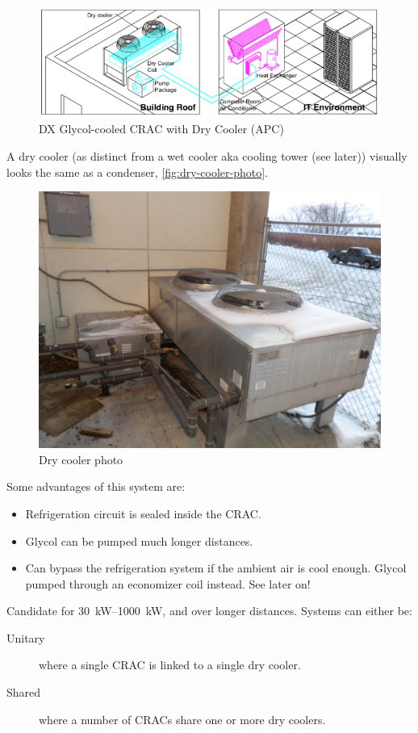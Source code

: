 \documentclass{pgnotes}
\begin{document}
\begin{figure}[hptb]
  \centering
  \includegraphics[width=1.0\linewidth]{crac_dx_glycol_schematic}
  \caption{DX Glycol-cooled CRAC with Dry Cooler (APC)}
  \label{fig:crac-dx-glycol-dry-cooler}
\end{figure}

A dry cooler (as distinct from a wet cooler aka cooling tower (see later)) visually looks the same as a condenser, \autoref{fig:dry-cooler-photo}.

\begin{figure}[htbp]
    \centering
    \includegraphics[width=0.4\linewidth]{dry_cooler_photo}
    \caption{Dry cooler photo}
    \label{fig:dry-cooler-photo}
\end{figure}

Some advantages of this system are:
\begin{itemize}
\item Refrigeration circuit is sealed inside the CRAC.
\item Glycol can be pumped much longer distances.
\item Can bypass the refrigeration system if the ambient air is cool enough. Glycol pumped through an economizer coil instead. See later on!
\end{itemize}

Candidate for \SIrange{30}{1000}{\kilo\watt}, and over longer distances.
Systems can either be:
\begin{description}
\item[Unitary] where a single CRAC is linked to a single dry cooler.
\item[Shared] where a number of CRACs share one or more dry coolers.
\end{description}
\end{document}
